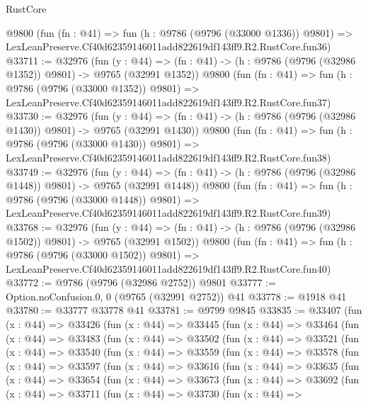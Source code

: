 \begin{lexlean}{RustCore}
\begin{coremodule}
    @9800
    (fun (fn : @41) =>
    fun (h : @9786 (@9796 (@33000 @1336)) @9801) =>
    LexLeanPreserve.Cf40d62359146011add822619df143ff9.R2.RustCore.fun36)
@33711 := @32976
    (fun (y : @44) =>
    (fn : @41) -> (h : @9786 (@9796 (@32986 @1352)) @9801) -> @9765 (@32991 @1352))
    @9800
    (fun (fn : @41) =>
    fun (h : @9786 (@9796 (@33000 @1352)) @9801) =>
    LexLeanPreserve.Cf40d62359146011add822619df143ff9.R2.RustCore.fun37)
@33730 := @32976
    (fun (y : @44) =>
    (fn : @41) -> (h : @9786 (@9796 (@32986 @1430)) @9801) -> @9765 (@32991 @1430))
    @9800
    (fun (fn : @41) =>
    fun (h : @9786 (@9796 (@33000 @1430)) @9801) =>
    LexLeanPreserve.Cf40d62359146011add822619df143ff9.R2.RustCore.fun38)
@33749 := @32976
    (fun (y : @44) =>
    (fn : @41) -> (h : @9786 (@9796 (@32986 @1448)) @9801) -> @9765 (@32991 @1448))
    @9800
    (fun (fn : @41) =>
    fun (h : @9786 (@9796 (@33000 @1448)) @9801) =>
    LexLeanPreserve.Cf40d62359146011add822619df143ff9.R2.RustCore.fun39)
@33768 := @32976
    (fun (y : @44) =>
    (fn : @41) -> (h : @9786 (@9796 (@32986 @1502)) @9801) -> @9765 (@32991 @1502))
    @9800
    (fun (fn : @41) =>
    fun (h : @9786 (@9796 (@33000 @1502)) @9801) =>
    LexLeanPreserve.Cf40d62359146011add822619df143ff9.R2.RustCore.fun40)
@33772 := @9786 (@9796 (@32986 @2752)) @9801
@33777 := Option.noConfusion.{0, 0} (@9765 (@32991 @2752)) @41
@33778 := @1918 @41
@33780 := @33777 @33778 @41
@33781 := @9799 @9845
@33835 := @33407
    (fun (x : @44) =>
    @33426
      (fun (x : @44) =>
      @33445
        (fun (x : @44) =>
        @33464
          (fun (x : @44) =>
          @33483
            (fun (x : @44) =>
            @33502
              (fun (x : @44) =>
              @33521
                (fun (x : @44) =>
                @33540
                  (fun (x : @44) =>
                  @33559
                    (fun (x : @44) =>
                    @33578
                      (fun (x : @44) =>
                      @33597
                        (fun (x : @44) =>
                        @33616
                          (fun (x : @44) =>
                          @33635
                            (fun (x : @44) =>
                            @33654
                              (fun (x : @44) =>
                              @33673
                                (fun (x : @44) =>
                                @33692
                                  (fun (x : @44) =>
                                  @33711
                                    (fun (x : @44) =>
                                    @33730
                                      (fun (x : @44) =>

\end{coremodule}
\end{lexlean}
